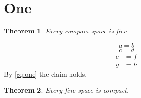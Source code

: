 \documentclass{article}
\newtheorem{thm}{Theorem}[section]
\begin{document}
\section{One}
\begin{thm} Every compact space is fine. \end{thm}
\begin{equation}
a = b \label{eq:one}
\end{equation}
\begin{equation}
c = d \label{eq:two}
\end{equation}
\begin{align}
e &= f \\
g &= h
\end{align}
By \eqref{eq:one} the claim holds.
\begin{thm} Every fine space is compact. \end{thm}
\end{document}
